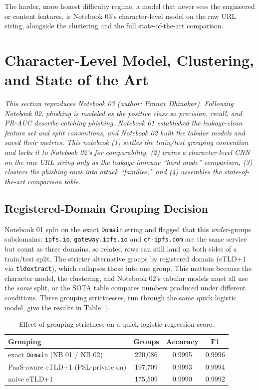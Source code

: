 \documentclass[stu,12pt,floatsintext]{apa7}
\newcommand{\code}[1]{\texttt{#1}}
\begin{document}
The harder, more honest difficulty regime, a model that never sees the
engineered or content features, is Notebook 03's character-level model on
the raw URL string, alongside the clustering and the full state-of-the-art
comparison.

\section{Character-Level Model, Clustering, and State of the Art}

\emph{This section reproduces Notebook 03 (author: Pranav Dhinakar).
Following Notebook 02, phishing is modeled as the positive class so
precision, recall, and PR-AUC describe catching phishing. Notebook 01
established the leakage-clean feature set and split conventions, and
Notebook 02 built the tabular models and saved their metrics. This
notebook (1) settles the train/test grouping convention and locks it to
Notebook 02's for comparability, (2) trains a character-level CNN on the
raw URL string only as the leakage-immune ``hard mode'' comparison, (3)
clusters the phishing rows into attack ``families,'' and (4) assembles the
state-of-the-art comparison table.}

\subsection{Registered-Domain Grouping Decision}

Notebook 01 split on the exact \code{Domain} string and flagged that this
\emph{under}-groups subdomains: \code{ipfs.io}, \code{gateway.ipfs.io} and
\code{cf-ipfs.com} are the same service but count as three domains, so
related rows can still land on both sides of a train/test split. The
stricter alternative groups by registered domain (eTLD+1 via
\code{tldextract}), which collapses those into one group. This matters
because the character model, the clustering, and Notebook 02's tabular
models must all use the \emph{same} split, or the SOTA table compares
numbers produced under different conditions. Three grouping strictnesses,
run through the same quick logistic model, give the results in
Table~\ref{tab:grouping}.

\begin{table}[htbp]
\centering
\caption{Effect of grouping strictness on a quick logistic-regression
score.}
\label{tab:grouping}
\begin{tabular}{lccc}
\toprule
Grouping & Groups & Accuracy & F1 \\
\midrule
exact \code{Domain} (NB 01 / NB 02)     & 220{,}086 & 0.9995 & 0.9996 \\
PaaS-aware eTLD+1 (PSL-private on)       & 197{,}709 & 0.9993 & 0.9994 \\
naive eTLD+1                             & 175{,}509 & 0.9990 & 0.9992 \\
\bottomrule
\end{tabular}
\end{table}
\end{document}
